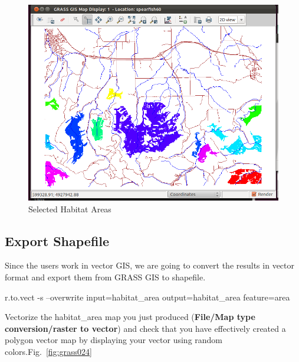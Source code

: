 \begin{figure}[htbp]
   \centering
   \includegraphics[scale=0.35]{grass023.png}
   \caption{Selected Habitat Areas}
   \label{fig:grass023}
\end{figure}

\subsection{Export Shapefile}
Since the users work in vector GIS, we are going to convert the results in vector format and export them from GRASS GIS to shapefile.

\begin{smallverbatim}
r.to.vect -s --overwrite input=habitat_area
 output=habitat_area feature=area
\end{smallverbatim}

Vectorize the habitat\_area map you just produced (\textbf{File/Map type conversion/raster to vector}) and check that you have effectively created a polygon vector map by displaying your vector using random colors.Fig.~\ref{fig:grass024}

